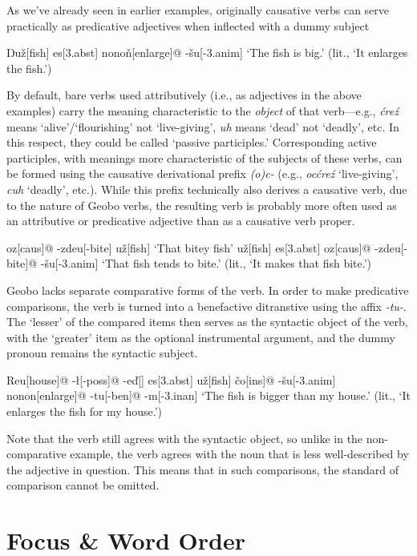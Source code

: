 \documentclass[a4paper,11pt,oneside,openany]{memoir}
\newcommand{\vd}{ď}
\newcommand{\vc}{č}
\newcommand{\vz}{ž}
\newcommand{\vs}{š}
\newcommand{\vn}{ň}
\newcommand{\Engma}{Ŋ}
\begin{document}
As we've already seen in earlier examples, originally causative verbs can serve practically as predicative adjectives when inflected with a dummy subject

\ex
\begingl
\Engma u\vz[fish]
es[\sc 3.abst]
nono\vn[enlarge]@
-\vs u[\sc -3.anim]
\glft `The fish is big.' (lit., `It enlarges the fish.')
\endgl
\xe

By default, bare verbs used attributively (i.e., as adjectives in the above examples) carry the meaning characteristic to the \textit{object} of that verb---e.g., \textit{\'cre\'z} means `alive'/`flourishing' not `live-giving', \textit{uh} means `dead' not `deadly', etc. In this respect, they could be called `passive participles.' Corresponding active participles, with meanings more characteristic of the subjects of these verbs, can be formed using the causative derivational prefix \textit{(o)c-} (e.g., \textit{oc\'cre\'z} `live-giving', \textit{cuh} `deadly', etc.). While this prefix technically also derives a causative verb, due to the nature of Geobo{\engma} verbs, the resulting verb is probably more often used as an attributive or predicative adjective than as a causative verb proper.

\pex
\a
\begingl
oz[\sc caus]@
-zdeu[-bite]
\engma u\vz[fish]
\glft `That bitey fish'
\endgl
\a
\begingl
\engma u\vz[fish]
es[\sc 3.abst]
oz[\sc caus]@
-zdeu[-bite]@
-\vs u[\sc -3.anim]
\glft `That fish tends to bite.' (lit., `It makes that fish bite.')
\endgl
\xe

Geobo{\engma} lacks separate comparative forms of the verb. In order to make predicative comparisons, the verb is turned into a benefactive ditranstive using the affix \textit{-tu-}. The `lesser' of the compared items then serves as the syntactic object of the verb, with the `greater' item as the optional instrumental argument, and the dummy pronoun remains the syntactic subject.

\ex 
\begingl
Reu[house]@
-\l[\sc -poss]@
-e\vd[]
es[\sc 3.abst]
\engma u\vz[fish] 
\vc o[\sc ins]@
-\vs u[\sc -3.anim]
nonon[enlarge]@
-tu[\sc -ben]@
-m[\sc -3.inan]
\glft `The fish is bigger than my house.' (lit., `It enlarges the fish for my house.')
\endgl
\xe

Note that the verb still agrees with the syntactic object, so unlike in the non-comparative example, the verb agrees with the noun that is less well-described by the adjective in question. This means that in such comparisons, the standard of comparison cannot be omitted.

\section{Focus \& Word Order}\label{focus}
\end{document}

